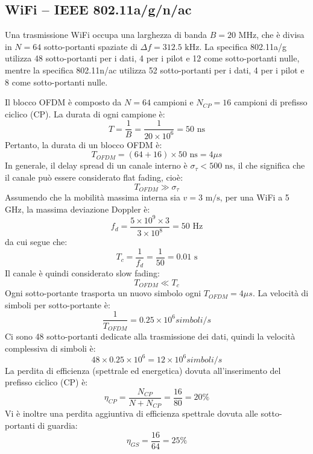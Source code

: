 

\subsection*{WiFi – IEEE 802.11a/g/n/ac}

Una trasmissione WiFi occupa una larghezza di banda \( B = 20 \text{ MHz} \), che è divisa in \( N = 64 \) sotto-portanti spaziate di \( \Delta f = 312.5 \text{ kHz} \). 
La specifica 802.11a/g utilizza 48 sotto-portanti per i dati, 4 per i pilot e 12 come sotto-portanti nulle, mentre la specifica 802.11n/ac utilizza 52 sotto-portanti per i dati, 4 per i pilot e 8 come sotto-portanti nulle.

Il blocco OFDM è composto da \( N = 64 \) campioni e \( N_{CP} = 16 \) campioni di prefisso ciclico (CP). La durata di ogni campione è:
\[
T = \frac{1}{B} = \frac{1}{20 \times 10^6} = 50 \text{ ns}
\]
Pertanto, la durata di un blocco OFDM è:
\[
    T_{OFDM} = (64 + 16) \times 50 \text{ ns} = 4 \si{\mu s}
\]
In generale, il delay spread di un canale interno è \( \sigma_\tau < 500 \text{ ns} \), il che significa che il canale può essere considerato flat fading, cioè:
\[
T_{OFDM} \gg \sigma_\tau
\]
Assumendo che la mobilità massima interna sia \( v = 3 \text{ m/s} \), per una WiFi a 5 GHz, la massima deviazione Doppler è:
\[
f_d = \frac{5 \times 10^9 \times 3}{3 \times 10^8} = 50 \text{ Hz}
\]
da cui segue che:
\[
T_c = \frac{1}{f_d} = \frac{1}{50} = 0.01 \text{ s}
\]
Il canale è quindi considerato slow fading:
\[
T_{OFDM} \ll T_c
\]
Ogni sotto-portante trasporta un nuovo simbolo ogni \( T_{OFDM} = 4 \si{ \mu s} \). La velocità di simboli per sotto-portante è:
\[
\frac{1}{T_{OFDM}} = 0.25 \times 10^6 \si{ simboli/s}
\]
Ci sono 48 sotto-portanti dedicate alla trasmissione dei dati, quindi la velocità complessiva di simboli è:
\[
48 \times 0.25 \times 10^6 = 12 \times 10^6 \si{ simboli/s}
\]
La perdita di efficienza (spettrale ed energetica) dovuta all'inserimento del prefisso ciclico (CP) è:
\[
\eta_{CP} = \frac{N_{CP}}{N + N_{CP}} = \frac{16}{80} = 20\%
\]
Vi è inoltre una perdita aggiuntiva di efficienza spettrale dovuta alle sotto-portanti di guardia:
\[
\eta_{GS} = \frac{16}{64} = 25\%
\]
